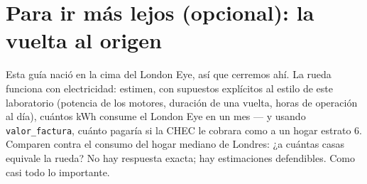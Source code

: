 \documentclass[12pt,letterpaper]{article}
\begin{document}
\section{Para ir más lejos (opcional): la vuelta al origen}
Esta guía nació en la cima del London Eye, así que cerremos ahí. La rueda funciona con electricidad: estimen, con supuestos explícitos al estilo de este laboratorio (potencia de los motores, duración de una vuelta, horas de operación al día), cuántos kWh consume el London Eye en un mes --- y usando \texttt{valor\_factura}, cuánto pagaría si la CHEC le cobrara como a un hogar estrato 6. Comparen contra el consumo del hogar mediano de Londres: ¿a cuántas casas equivale la rueda? No hay respuesta exacta; hay estimaciones defendibles. Como casi todo lo importante.
\end{document}
